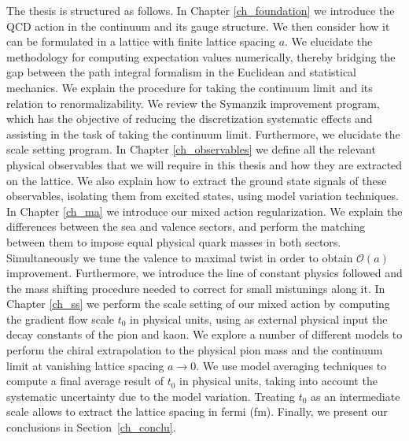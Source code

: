 The thesis is structured as follows. In Chapter \ref{ch_foundation} we introduce the QCD action in the continuum and its gauge structure. We then consider how it can be formulated in a lattice with finite lattice spacing $a$. We elucidate the methodology for computing expectation values numerically, thereby bridging the gap between the path integral formalism in the Euclidean and statistical mechanics. We explain the procedure for taking the continuum limit and its relation to renormalizability. We review the Symanzik improvement program, which has the objective of reducing the discretization systematic effects and assisting in the task of taking the continuum limit. Furthermore, we elucidate the scale setting program. In Chapter \ref{ch_observables} we define all the relevant physical observables that we will require in this thesis and how they are extracted on the lattice. We also explain how to extract the ground state signals of these observables, isolating them from excited states, using model variation techniques. In Chapter \ref{ch_ma} we introduce our mixed action regularization. We explain the differences between the sea and valence sectors, and perform the matching between them to impose equal physical quark masses in both sectors. Simultaneously we tune the valence to maximal twist in order to obtain $\mathcal{O}(a)$ improvement. Furthermore, we introduce the line of constant physics followed and the mass shifting procedure needed to correct for small mistunings along it. In Chapter \ref{ch_ss} we perform the scale setting of our mixed action by computing the gradient flow scale $t_0$ in physical units, using as external physical input the decay constants of the pion and kaon. We explore a number of different models to perform the chiral extrapolation to the physical pion mass and the continuum limit at vanishing lattice spacing $a\to0$. We use model averaging techniques to compute a final average result of $t_0$ in physical units, taking into account the systematic uncertainty due to the model variation. Treating $t_0$ as an intermediate scale allows to extract the lattice spacing in fermi (fm). Finally, we present our conclusions in Section~\ref{ch_conclu}.

